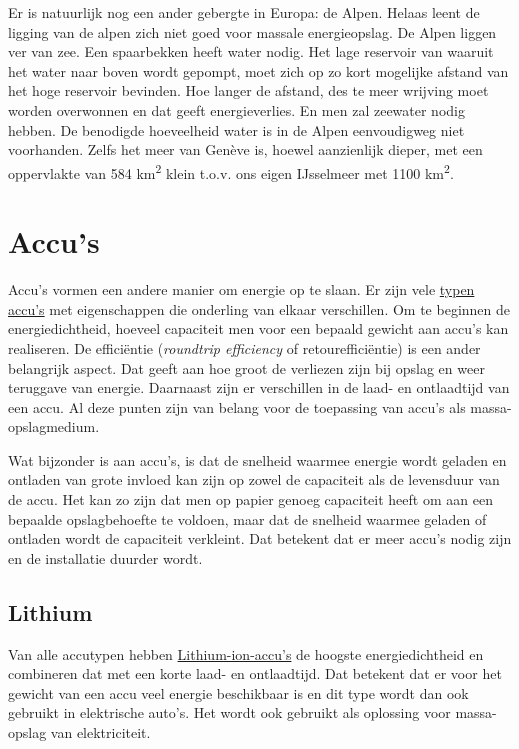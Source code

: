 \documentclass[
  11pt,
  a4paper,
]{book}
\begin{document}
Er is natuurlijk nog een ander gebergte in Europa: de Alpen. Helaas leent de ligging van de alpen zich niet goed voor massale energieopslag. De Alpen liggen ver van zee. Een spaarbekken heeft water nodig. Het lage reservoir van waaruit het water naar boven wordt gepompt, moet zich op zo kort mogelijke afstand van het hoge reservoir bevinden. Hoe langer de afstand, des te meer wrijving moet worden overwonnen en dat geeft energieverlies. En men zal zeewater nodig hebben. De benodigde hoeveelheid water is in de Alpen eenvoudigweg niet voorhanden. Zelfs het meer van Genève is, hoewel aanzienlijk dieper, met een oppervlakte van 584 km\textsuperscript{2} klein t.o.v. ons eigen IJsselmeer met 1100 km\textsuperscript{2}.

\hypertarget{accus}{%
\section{Accu's}\label{accus}}

Accu's vormen een andere manier om energie op te slaan. Er zijn vele \href{https://nl.wikipedia.org/wiki/Oplaadbare_batterij}{typen accu's} met eigenschappen die onderling van elkaar verschillen. Om te beginnen de energiedichtheid, hoeveel capaciteit men voor een bepaald gewicht aan accu's kan realiseren. De efficiëntie (\emph{roundtrip efficiency} of retourefficiëntie) is een ander belangrijk aspect. Dat geeft aan hoe groot de verliezen zijn bij opslag en weer teruggave van energie. Daarnaast zijn er verschillen in de laad- en ontlaadtijd van een accu. Al deze punten zijn van belang voor de toepassing van accu's als massa-opslagmedium.

Wat bijzonder is aan accu's, is dat de snelheid waarmee energie wordt geladen en ontladen van grote invloed kan zijn op zowel de capaciteit als de levensduur van de accu. Het kan zo zijn dat men op papier genoeg capaciteit heeft om aan een bepaalde opslagbehoefte te voldoen, maar dat de snelheid waarmee geladen of ontladen wordt de capaciteit verkleint. Dat betekent dat er meer accu's nodig zijn en de installatie duurder wordt.

\hypertarget{lithium}{%
\subsection{Lithium}\label{lithium}}

Van alle accutypen hebben \href{https://en.wikipedia.org/wiki/Lithium-ion_battery}{Lithium-ion-accu's} de hoogste energiedichtheid en combineren dat met een korte laad- en ontlaadtijd. Dat betekent dat er voor het gewicht van een accu veel energie beschikbaar is en dit type wordt dan ook gebruikt in elektrische auto's. Het wordt ook gebruikt als oplossing voor massa-opslag van elektriciteit.
\end{document}
